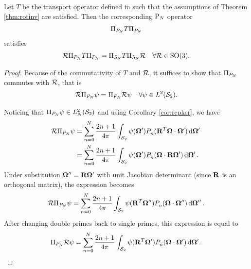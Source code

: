 \begin{theorem}\label{thm:commut_NTE}
Let $T$ be the transport operator defined in  such that the assumptions of Theorem
\ref{thm:rotinv} are satisfied. 
Then the corresponding $\PN$ operator
\begin{equation*}
	\Projop\op{T}\Projop
\end{equation*}
satisfies 
$$
\genop{R}\Projop\op{T}\Projop = \Projop[S_N]\op{T}\Projop[S_N]\genop{R}\quad \forall
\genop{R}\in\mathrm{SO}(3). 
$$
\end{theorem}
\begin{proof}
Because of the commutativity of $T$ and $\genop{R}$, it suffices to show that $\Projop$ commutes
with $\genop{R}$, that is 
\begin{equation}\label{eq:thm1_point}
	\genop{R} \Projop \psi = \Projop \genop{R} \psi\quad  \forall \psi \in \Lp[2](\Sphere).
\end{equation}

\noindent Noticing that $\Projop\psi \in \Lp[2]_N(\Sphere)$ and using Corollary \ref{cor:repker}, we have
$$
\begin{aligned}
	\genop{R} \Projop \psi &= 
	\sum_{n=0}^{N} \frac{2n+1}{4\pi} \intA[']{\psi(\bomega')\P{n}{}(\mat{R}^T\bomega\cdot\bomega')}\\ 
	&= \sum_{n=0}^{N} \frac{2n+1}{4\pi}
	\intA[']{\psi(\bomega')\P{n}{}(\bomega\cdot\mat{R}\bomega')}.
\end{aligned}
$$
Under substitution $\bomega'' = \mat{R}\bomega'$ with unit Jacobian determinant (since $\mat{R}$ is an orthogonal
matrix), the expression becomes
$$
	\genop{R} \Projop \psi = \sum_{n=0}^{N} \frac{2n+1}{4\pi}
	\intA['']{\psi(\mat{R}^T\bomega'')\P{n}{}(\bomega\cdot\bomega'')}.
$$
After changing double primes back to single primes, this expression is equal to
$$
	\Projop \genop{R}\psi = \sum_{n=0}^{N} \frac{2n+1}{4\pi}
	\intA[']{\psi(\mat{R}^T\bomega')\P{n}{}(\bomega\cdot\bomega')}.
$$
\end{proof}




